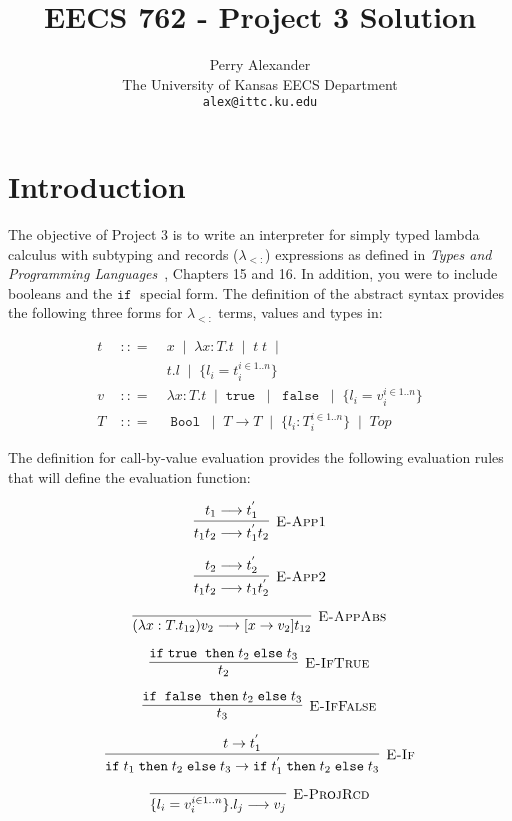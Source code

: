 \documentclass[10pt]{article}
\title{EECS 762 - Project 3 Solution}
\author{Perry Alexander \\
  The University of Kansas EECS Department\\
  \texttt{alex@ittc.ku.edu}}
\newcommand{\isa}{\ensuremath{\; {:}{:}{=} \;}}
\newcommand{\ora}{\ensuremath{\;\mid\;}}
\newcommand{\IF}{\ensuremath{\mathtt{ if \;}}}
\newcommand{\THEN}{\ensuremath{\mathtt{\; then \;}}}
\newcommand{\ELSE}{\ensuremath{\mathtt{\; else \;}}}
\newcommand{\TRUE}{\ensuremath{\mathtt{ true \;}}}
\newcommand{\FALSE}{\ensuremath{\mathtt{\; false \;}}}
\newcommand{\BOOL}{\ensuremath{\mathtt{\; Bool \;}}}
\begin{document}
\maketitle

\section{Introduction}

The objective of Project 3 is to write an interpreter for simply typed
lambda calculus with subtyping and records ($\lambda_{<:}$)
expressions as defined in \emph{Types and Programming
Languages}~\cite{Pie02a}, Chapters 15 and 16.  In addition, you were
to include booleans and the $\IF$ special form.  The definition of the
abstract syntax provides the following three forms for $\lambda_{<:}$
terms, values and types in:

\begin{eqnarray*}
  t & \isa & x \ora \lambda x:T.t \ora t\; t \ora \\
    &      & t.l \ora \{l_i=t_i^{i\in 1..n}\} \\
  v & \isa & \lambda x:T.t \ora \TRUE \ora \FALSE \ora \{l_i=v_i^{i\in 1..n}\}\\
  T & \isa & \BOOL \ora T \rightarrow T \ora \{l_i:T_i^{i\in 1..n}\} \ora Top
\end{eqnarray*}

The definition for call-by-value evaluation provides the following
evaluation rules that will define the evaluation function:

\[\vcenter{\infer[\textsc{E-App1}]
	{t_1 t_2 \longrightarrow t_1^{'} t_2}
	{t_1\longrightarrow t_1^{'}}}\]

\[\vcenter{\infer[\textsc{E-App2}]
	{t_1 t_2 \longrightarrow t_1 t_2^{'}}
	{t_2\longrightarrow t_2^{'}}}\]

\[\vcenter{\infer[\textsc{E-AppAbs}]
	{(\lambda x:T.t_{12})v_2 \longrightarrow [x\rightarrow v_2]t_{12}}
	{}}\]

\[\vcenter{\infer[\textsc{E-IfTrue}]
	{t_2}
	{\IF \TRUE \THEN t_2 \ELSE t_3}}\]

\[\vcenter{\infer[\textsc{E-IfFalse}]
	{t_3}
	{\IF \FALSE \THEN t_2 \ELSE t_3}}\]

\[\vcenter{\infer[\textsc{E-If}]
  {\IF t_1 \THEN t_2 \ELSE t_3 \rightarrow \IF t_1^{'} \THEN t_2 \ELSE t_3}
  {t\rightarrow t_1^{'}}}\]

\[\vcenter{\infer[\textsc{E-ProjRcd}]
  {\{l_i=v_i^{i\in 1..n}\}.l_j \longrightarrow v_j}
  {}}\]
\end{document}
